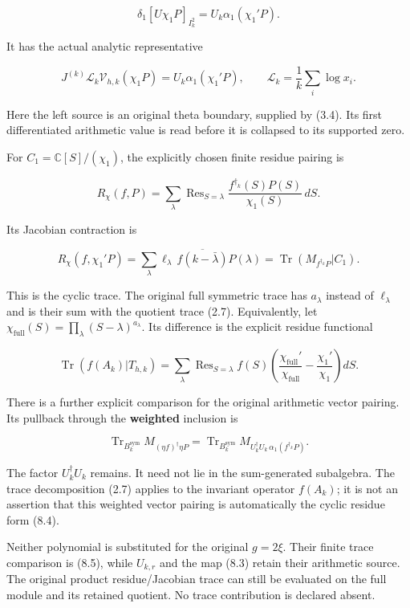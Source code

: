 \[\boxed{\delta_1[U\chi_1P]_{I_k^2}
=U_k\alpha_1(\chi_1'P).}\tag{8.2}\]

It has the actual analytic representative

\[J^{(k)}\mathscr L_k\mathcal V_{h,k}(\chi_1P)
=U_k\alpha_1(\chi_1'P),\qquad
\mathscr L_k=\frac1k\sum_i\log x_i.\tag{8.3}\]

Here the left source is an original theta boundary, supplied by (3.4).
Its first differentiated arithmetic value is read before it is collapsed
to its supported zero.

For \(C_1=\mathbb C[S]/(\chi_1)\), the explicitly chosen finite residue
pairing is

\[R_\chi(f,P)=\sum_\lambda\operatorname{Res}_{S=\lambda}
\frac{f^{\dagger_k}(S)P(S)}{\chi_1(S)}\,dS.\]

Its Jacobian contraction is

\[\boxed{R_\chi(f,\chi_1'P)
=\sum_\lambda \ell_\lambda\,\overline{f(k-\bar\lambda)}P(\lambda)
=\operatorname{Tr}(M_{f^{\dagger_k}P}|C_1).}\tag{8.4}\]

This is the cyclic trace. The original full symmetric trace has
\(a_\lambda\) instead of \(\ell_\lambda\) and is their sum with the
quotient trace (2.7). Equivalently, let
\(\chi_{\mathrm{full}}(S)=\prod_\lambda(S-\lambda)^{a_\lambda}\). Its
difference is the explicit residue functional

\[\boxed{\operatorname{Tr}(f(A_k)|T_{h,k})
=\sum_\lambda\operatorname{Res}_{S=\lambda}f(S)
\left(\frac{\chi_{\mathrm{full}}'}{\chi_{\mathrm{full}}}-
\frac{\chi_1'}{\chi_1}\right)dS.}\tag{8.5}\]

There is a further explicit comparison for the original arithmetic
vector pairing. Its pullback through the \textbf{weighted} inclusion is

\[\operatorname{Tr}_{B_k^{\mathrm{sym}}}M_{(\eta f)^\dagger\eta P}
=\operatorname{Tr}_{B_k^{\mathrm{sym}}}M_{U_k^\dagger U_k\,\alpha_1(f^{\dagger_k}P)}.\tag{8.6}\]

The factor \(U_k^\dagger U_k\) remains. It need not lie in the
sum-generated subalgebra. The trace decomposition (2.7) applies to the
invariant operator \(f(A_k)\); it is not an assertion that this weighted
vector pairing is automatically the cyclic residue form (8.4).

Neither polynomial is substituted for the original \(g=2\xi\). Their
finite trace comparison is (8.5), while \(U_{k,r}\) and the map (8.3)
retain their arithmetic source. The original product residue/Jacobian
trace can still be evaluated on the full module and its retained
quotient. No trace contribution is declared absent.

